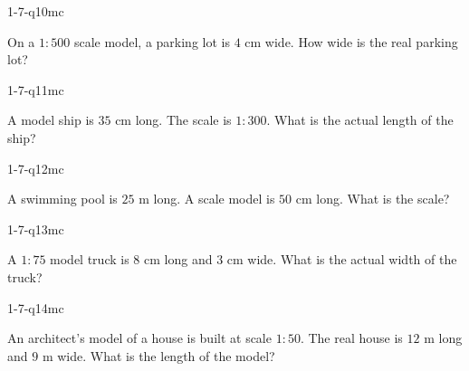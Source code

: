 \begin{practiceQuestion}{1-7-q10}{mc}
\begin{questionText}
On a $1 : 500$ scale model, a parking lot is $4$ cm wide. How wide is the real parking lot?
\end{questionText}
\end{practiceQuestion}

\begin{practiceQuestion}{1-7-q11}{mc}
\begin{questionText}
A model ship is $35$ cm long. The scale is $1 : 300$. What is the actual length of the ship?
\end{questionText}
\end{practiceQuestion}

\begin{practiceQuestion}{1-7-q12}{mc}
\begin{questionText}
A swimming pool is $25$ m long. A scale model is $50$ cm long. What is the scale?
\end{questionText}
\end{practiceQuestion}

\begin{practiceQuestion}{1-7-q13}{mc}
\begin{questionText}
A $1 : 75$ model truck is $8$ cm long and $3$ cm wide. What is the actual width of the truck?
\end{questionText}
\end{practiceQuestion}

\begin{practiceQuestion}{1-7-q14}{mc}
\begin{questionText}
An architect's model of a house is built at scale $1 : 50$. The real house is $12$ m long and $9$ m wide. What is the length of the model?
\end{questionText}
\end{practiceQuestion}

